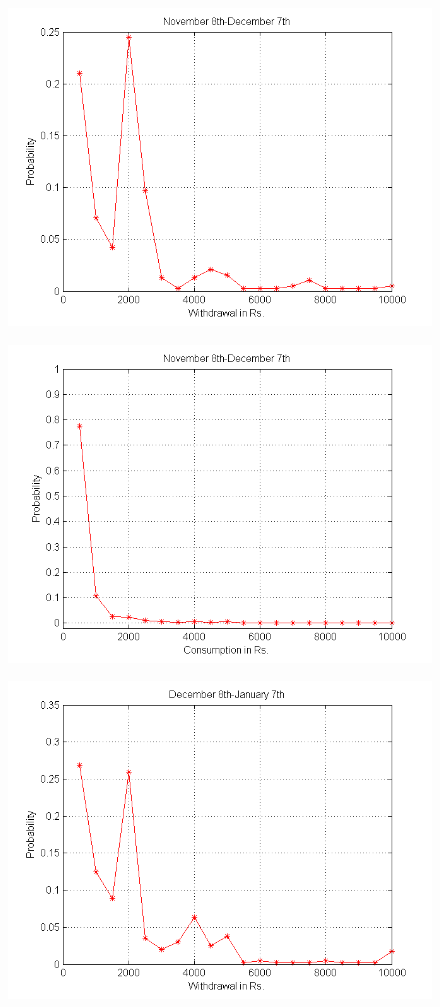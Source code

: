\documentclass[12pt]{article}
\begin{document}
\begin{figure}
	\centering
	\includegraphics[scale=0.65]{WNOV.png}
	\caption{}
	\label{fig:fig3}
\end{figure}
\begin{figure}
	\centering
	\includegraphics[scale=0.65]{CNOV.png}
	\caption{}
	\label{fig:fig4}
\end{figure}
\begin{figure}
	\centering
	\includegraphics[scale=0.65]{WDEC.png}
	\caption{}
	\label{fig:fig5}
\end{figure}
\end{document}
